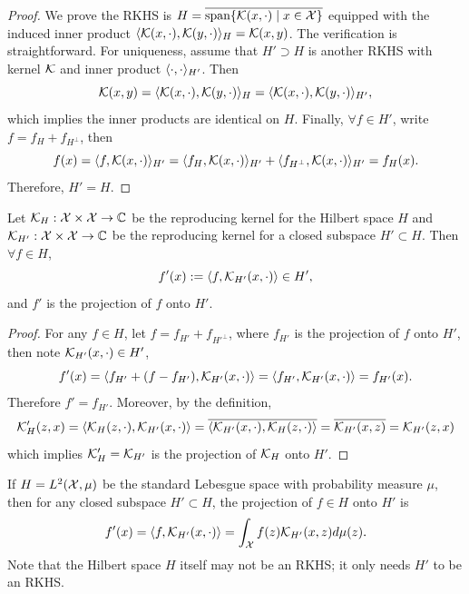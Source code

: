 \begin{proof}
    We prove the RKHS is $H=\overline{\text{span}\{\mathcal K(x, \cdot) \mid x\in \mathcal X\}}$ equipped with the induced inner product $\langle {\mathcal K(x, \cdot), \mathcal K(y,\cdot)} \rangle_H = \mathcal K(x, y)$. The verification is straightforward. For uniqueness, assume that $H'\supset H$ is another RKHS with kernel $\mathcal K$ and inner product $\langle {\cdot, \cdot} \rangle_{H'}$. Then 
    \begin{equation}
        \mathcal K(x, y) = \langle {\mathcal K(x, \cdot), \mathcal K(y,\cdot)} \rangle_H = \langle {\mathcal K(x, \cdot), \mathcal K(y,\cdot)} \rangle_{H'},
    \end{equation}
    which implies the inner products are identical on $H$. Finally, $\forall f\in H'$, write $f = f_H + f_{H^{\perp}}$, then 
    \begin{equation}
        f(x) = \langle {f, \mathcal K(x, \cdot)} \rangle_{H'} = \langle {f_H, \mathcal K(x, \cdot)} \rangle_{H'}  + \langle {f_{H^\perp}, \mathcal K(x, \cdot)} \rangle_{H'} = f_H(x).
    \end{equation}
    Therefore, $H'=H$.
\end{proof}
\begin{theorem}
    Let $\mathcal K_{H}:\mathcal X\times \mathcal X \to \mathbb C$ be the reproducing kernel for the Hilbert space $H$ and $\mathcal K_{H'}: \mathcal X\times \mathcal X \to \mathbb C$ be the reproducing kernel for a closed subspace $H'\subset H$. Then $\forall f\in H$,  
    \begin{equation}
        f'(x) := \langle {f, \mathcal K_{H'}(x, \cdot)} \rangle \in H',
    \end{equation}
    and $f'$ is the projection of $f$ onto $H'$.
\end{theorem}
\begin{proof}
    For any $f\in  H$, let $f = f_{H'} + f_{H'^{\perp}}$, where $f_{H'}$ is the projection of $f$ onto $H'$, then note $\mathcal K_{H'}(x, \cdot)\in H'$,  
    \begin{equation}
        f'(x) = \langle {f_{H'} + (f - f_{H'}), \mathcal K_{H'}(x, \cdot)} \rangle = \langle {f_{H'}, \mathcal K_{H'}(x, \cdot)} \rangle = f_{H'}(x). 
    \end{equation}
    Therefore $f' = f_{H'}$. Moreover, by the definition, 
    \begin{equation}
        \mathcal K'_{H}(z, x) = \langle {\mathcal K_{H}(z, \cdot), \mathcal K_{H'}(x, \cdot)} \rangle = \overline{ \langle {\mathcal K_{H'}(x, \cdot), \mathcal K_{H}(z, \cdot)} \rangle } = \overline{\mathcal K_{H'}(x, z)} = \mathcal K_{H'}(z, x) 
    \end{equation}
    which implies $\mathcal K'_{H}=\mathcal K_{H'}$ is the projection of $\mathcal K_{H}$ onto $H'$.
\end{proof}
\begin{example}
    If $H = L^2(\mathcal X, \mu)$ be the standard Lebesgue space with probability measure $\mu$, then for any closed subspace $H'\subset H$, the projection of $f\in H$ onto $H'$ is
    \begin{equation}
        f'(x) = \langle {f, \mathcal K_{H'}(x, \cdot)} \rangle = \int_{\mathcal X} f(z) \mathcal K_{H'}(x, z) d\mu(z). 
    \end{equation}
    Note that the Hilbert space $H$ itself may not be an RKHS; it only needs $H'$ to be an RKHS. 
\end{example}
